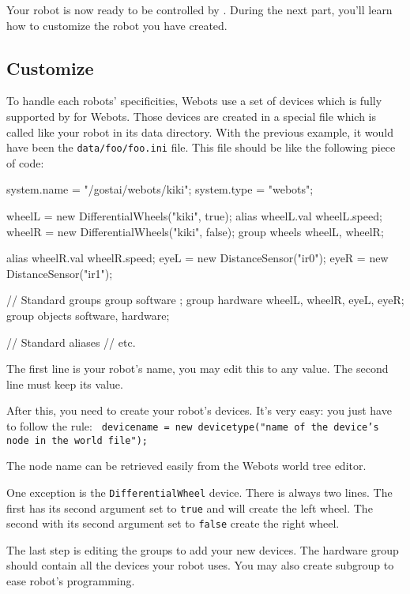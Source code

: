 Your robot is now ready to be controlled by \urbi. During the next
part, you'll learn how to customize the robot you have created.


\subsection{Customize}
\label{webots.own.customize}%

To handle each robots' specificities, Webots use a set of devices
which is fully supported by \urbi for Webots. Those devices are created
in a special file which is called like your robot in its data
directory. With the previous example, it would have been the
\nolinkurl{data/foo/foo.ini} file. This file should be like the
following piece of code:


\begin{urbifixme}
system.name = "/gostai/webots/kiki";
system.type = "webots";


wheelL = new DifferentialWheels("kiki", true);
alias wheelL.val wheelL.speed;
wheelR = new DifferentialWheels("kiki", false);
group wheels {wheelL, wheelR};

alias wheelR.val wheelR.speed;
eyeL = new DistanceSensor("ir0");
eyeR = new DistanceSensor("ir1");

// Standard groups
group software {};
group hardware {wheelL, wheelR, eyeL, eyeR};
group objects {software, hardware};

// Standard aliases
// etc.
\end{urbifixme}

The first line is your robot's name, you may edit this to any value.
The second line must keep its value.


After this, you need to create your robot's devices. It's very easy:
you just have to follow the rule: \texttt{
  d\-e\-v\-i\-c\-e\-n\-a\-m\-e = n\-e\-w
  d\-e\-v\-i\-c\-e\-t\-y\-p\-e\-(\-"\-n\-a\-m\-e o\-f t\-h\-e
  d\-e\-v\-i\-c\-e\-'\-s n\-o\-d\-e i\-n t\-h\-e w\-o\-r\-l\-d
  f\-i\-l\-e\-"\-)\-;\- }

The node name can be retrieved easily from the Webots world tree
editor.

One exception is the
\texttt{D\-i\-f\-f\-e\-r\-e\-n\-t\-i\-a\-l\-W\-h\-e\-e\-l} device.
There is always two lines. The first has its second argument set to
\texttt{t\-r\-u\-e} and will create the left wheel. The second with
its second argument set to \texttt{f\-a\-l\-s\-e} create the right
wheel.


The last step is editing the groups to add your new devices. The
hardware group should contain all the devices your robot uses. You may
also create subgroup to ease robot's programming.


